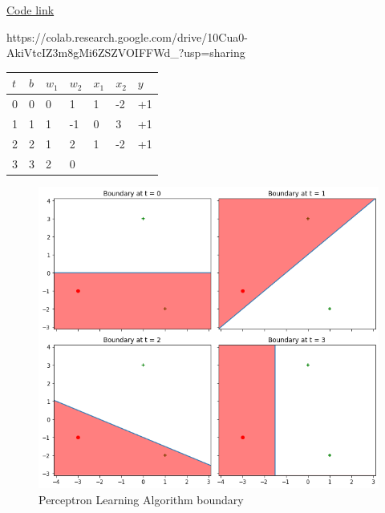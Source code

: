 \begin{solution}
  \href{https://colab.research.google.com/drive/10Cua0-AkiVtcIZ3m8gMi6ZSZVOIFFWd_?usp=sharing}{Code link}

  https://colab.research.google.com/drive/10Cua0-AkiVtcIZ3m8gMi6ZSZVOIFFWd_?usp=sharing
  
  \begin{table}[H]
    \centering

    \begin{tabular}{l|lll|ll|l}
    \hline

    \hline
    $t$ & $b$ & $w_1$ & $w_2$ & $x_1$ & $x_2$ & $y$ \\
    \hline
      0  &  0 & 0 & 1  & 1 & -2 & +1\\
      1  &  1 & 1 & -1 & 0 & 3 & +1\\
      2  &  2 & 1 & 2 & 1 & -2 & +1\\
      3  &  3 & 2 & 0 \\
    \hline
    \end{tabular}
  \end{table}

  \begin{figure}[H]
    \centering
    \includegraphics[width=0.75\linewidth]{images/4a.png}
    \caption{Perceptron Learning Algorithm boundary}
    \label{fig:4a}
  \end{figure}

\end{solution}

\newpage

